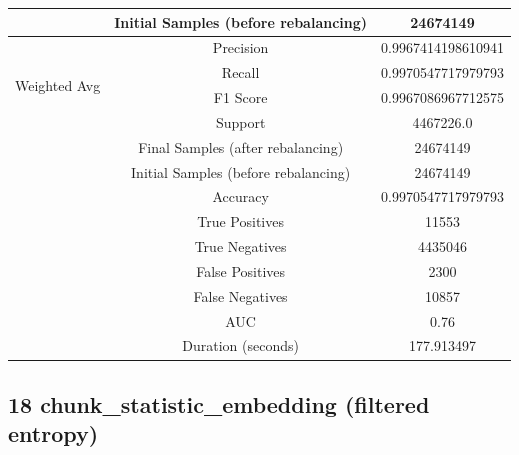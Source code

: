 \begin{longtable}{|c|c|c|}
 & Initial Samples (before rebalancing) & 24674149 \\
\hline
\multirow{4}{*}{Weighted Avg} & Precision & 0.9967414198610941 \\
 & Recall & 0.9970547717979793 \\
 & F1 Score & 0.9967086967712575 \\
 & Support & 4467226.0 \\
 & Final Samples (after rebalancing) & 24674149 \\
 & Initial Samples (before rebalancing) & 24674149 \\
\hline
& Accuracy & 0.9970547717979793 \\ \hline
& True Positives & 11553 \\ \hline
& True Negatives & 4435046 \\ \hline
& False Positives & 2300 \\ \hline
& False Negatives & 10857 \\ \hline
& AUC & 0.76 \\ \hline
& Duration (seconds) & 177.913497 \\ \hline
\end{longtable}


\subsection{18 chunk\_statistic\_embedding (filtered entropy)}

